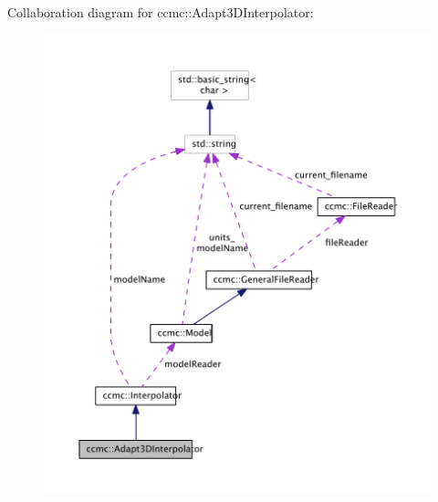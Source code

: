 Collaboration diagram for ccmc\-:\-:Adapt3\-D\-Interpolator\-:\nopagebreak
\begin{figure}[H]
\begin{center}
\leavevmode
\includegraphics[width=350pt]{classccmc_1_1_adapt3_d_interpolator__coll__graph}
\end{center}
\end{figure}
